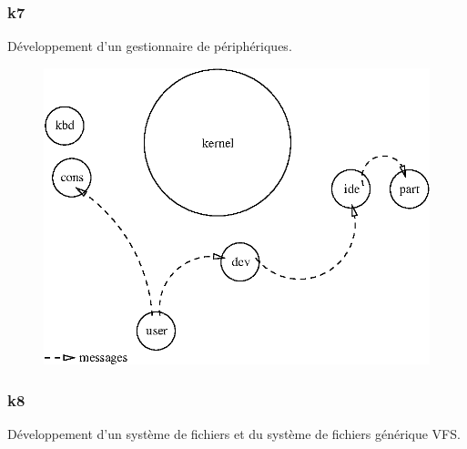 \documentclass[10pt,a4wide]{article}
\begin{document}
\newpage

\subsubsection{k7}

D\'eveloppement d'un gestionnaire de p\'eriph\'eriques.

\vspace{5cm}

\begin{figure}[h]
\centerline{\includegraphics{figures/k7.eps}}
\end{figure}

\newpage

\subsubsection{k8}

D\'eveloppement d'un syst\`eme de fichiers et du syst\`eme de fichiers
g\'en\'erique VFS.

\vspace{5cm}
\end{document}
